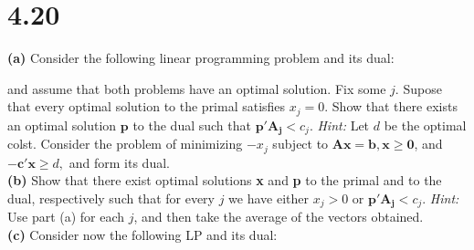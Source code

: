 \documentclass{article}
\begin{document}
\section*{4.20}
\textbf{(a)}  Consider the following linear programming problem and its dual:\\
\begin{Parallel}[v]{0.5\textwidth}{0.2\textwidth}
\ParallelPar
\end{Parallel}
and assume that both problems have an optimal solution.  Fix some $j$.  Supose that every optimal solution to the primal satisfies $x_j = 0$.  Show that there exists an optimal solution $\mathbf{p}$ to the dual such that $\mathbf{p'A_j} < c_j$.  \emph{Hint:} Let $d$ be the optimal colst.  Consider the problem of minimizing $-x_j$ subject to $\mathbf{Ax=b, x\geq 0}$, and $\mathbf{-c'x} \geq d,$ and form its dual.\\

\noindent \textbf{(b)} Show that there exist optimal solutions \textbf{x} and \textbf{p} to the primal and to the dual, respectively such that for every $j$ we have either $x_j > 0$ or $\mathbf{p'A_j} < c_j$.  \emph{Hint:} Use part (a) for each $j$, and then take the average of the vectors obtained. \\

\noindent \textbf{(c)} Consider now the following LP and its dual: \\
\end{document}
